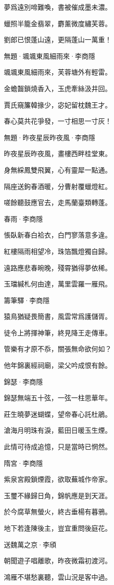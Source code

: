 \documentclass[12pt,a4paper]{ctexbook}
\begin{document}
夢爲遠別啼難喚，書被催成墨未濃。\par
蠟照半籠金翡翠，麝薰微度繡芙蓉。\par
劉郎已恨蓬山遠，更隔蓬山一萬重！\par
無題·颯颯東風細雨來·李商隱\par
颯颯東風細雨來，芙蓉塘外有輕雷。\par
金蟾齧鎖燒香入，玉虎牽絲汲井回。\par
賈氏窺簾韓掾少，宓妃留枕魏王才。\par
春心莫共花爭發，一寸相思一寸灰！\par
無題·昨夜星辰昨夜風·李商隱\par
昨夜星辰昨夜風，畫樓西畔桂堂東。\par
身無綵鳳雙飛翼，心有靈犀一點通。\par
隔座送鉤春酒暖，分曹射覆蠟燈紅。\par
嗟餘聽鼓應官去，走馬蘭臺類轉蓬。\par
春雨·李商隱\par
悵臥新春白袷衣，白門寥落意多違。\par
紅樓隔雨相望冷，珠箔飄燈獨自歸。\par
遠路應悲春晼晚，殘霄猶得夢依稀。\par
玉璫緘札何由達，萬里雲羅一雁飛。\par
籌筆驛·李商隱\par
猿鳥猶疑畏簡書，風雲常爲護儲胥。\par
徒令上將揮神筆，終見降王走傳車。\par
管樂有才原不忝，關張無命欲何如？\par
他年錦裏經祠廟，梁父吟成恨有餘。\par
錦瑟·李商隱\par
錦瑟無端五十弦，一弦一柱思華年。\par
莊生曉夢迷蝴蝶，望帝春心託杜鵑。\par
滄海月明珠有淚，藍田日暖玉生煙。\par
此情可待成追憶，只是當時已惘然。\par
隋宮·李商隱\par
紫泉宮殿鎖煙霞，欲取蕪城作帝家。\par
玉璽不緣歸日角，錦帆應是到天涯。\par
於今腐草無螢火，終古垂楊有暮鴉。\par
地下若逢陳後主，豈宜重問後庭花。\par
送魏萬之京·李頎\par
朝聞遊子唱離歌，昨夜微霜初渡河。\par
鴻雁不堪愁裏聽，雲山況是客中過。\par
\end{document}
